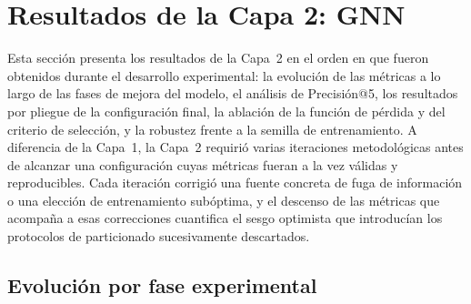\section{Resultados de la Capa 2: \acs{GNN}}
\label{sec:layer2}

Esta sección presenta los resultados de la Capa~2 en el orden en que fueron
obtenidos durante el desarrollo experimental: la evolución de las métricas a lo
largo de las fases de mejora del modelo, el análisis de Precisión@5, los
resultados por pliegue de la configuración final, la ablación de la función de
pérdida y del criterio de selección, y la robustez frente a la semilla de
entrenamiento. A diferencia de la Capa~1, la Capa~2 requirió varias iteraciones
metodológicas antes de alcanzar una configuración cuyas métricas fueran a la vez
válidas y reproducibles. Cada iteración corrigió una fuente concreta de fuga de
información o una elección de entrenamiento subóptima, y el descenso de las
métricas que acompaña a esas correcciones cuantifica el sesgo optimista que
introducían los protocolos de particionado sucesivamente descartados.

\subsection{Evolución por fase experimental}


